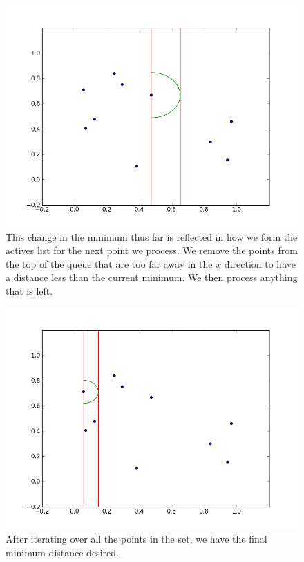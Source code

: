\begin{figure}[H]
\includegraphics[width = \textwidth]{simple2.png}
\caption{This change in the minimum thus far is reflected in how we form the actives list for the next point we process. 
We remove the points from the top of the queue that are too far away in the $x$ direction to have a distance less than the current minimum. 
We then process anything that is left.}
\end{figure}

\begin{figure}[H]
\includegraphics[width = \textwidth]{simple8.png}
\caption{After iterating over all the points in the set, we have the final minimum distance desired.}
\end{figure}

